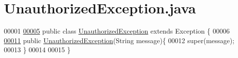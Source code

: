 \hypertarget{UnauthorizedException_8java_source}{\section{Unauthorized\-Exception.\-java}
}

\begin{DoxyCode}
00001 
\hypertarget{UnauthorizedException_8java_source_l00005}{}\hyperlink{classUnauthorizedException}{00005} \textcolor{keyword}{public} \textcolor{keyword}{class }\hyperlink{classUnauthorizedException}{UnauthorizedException} \textcolor{keyword}{extends} Exception \{
00006 
\hypertarget{UnauthorizedException_8java_source_l00011}{}\hyperlink{classUnauthorizedException_a597634d9a9c8271f0865caa57da998fb}{00011}     \textcolor{keyword}{public} \hyperlink{classUnauthorizedException_a597634d9a9c8271f0865caa57da998fb}{UnauthorizedException}(String message)\{
00012         super(message);
00013     \}
00014 
00015 \}
\end{DoxyCode}
